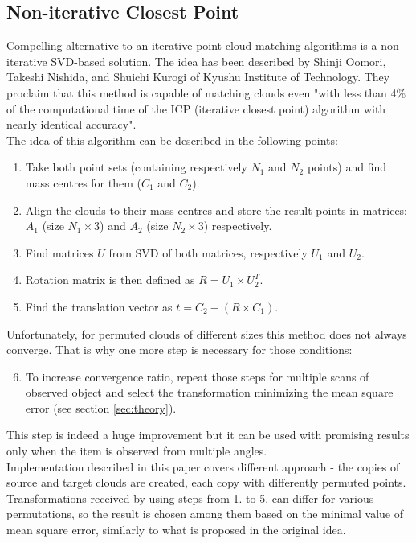 \documentclass[titlepage]{article}
\begin{document}
\subsection{Non-iterative Closest Point}
Compelling alternative to an iterative point cloud matching algorithms is a non-iterative SVD-based solution. The idea has been described by Shinji Oomori, Takeshi Nishida, and Shuichi Kurogi of Kyushu Institute of Technology. They proclaim that this method is capable of matching clouds even "with less than 4\% of the computational time of the ICP (iterative closest point) algorithm with nearly identical accuracy"\cite{nicp}.\\
The idea of this algorithm can be described in the following points:
\begin{enumerate}
\item Take both point sets (containing respectively $N_1$ and $N_2$ points) and find mass centres for them ($C_1$ and $C_2$).
\item Align the clouds to their mass centres and store the result points in matrices: $A_1$ (size $N_1 \times 3$) and $A_2$ (size $N_2 \times 3$) respectively.
\item Find matrices $U$ from SVD of both matrices, respectively $U_1$ and $U_2$.
\item Rotation matrix is then defined as $R = U_1 \times U_2^T$.
\item Find the translation vector as $t = C_2 - (R \times C_1)$.
\end{enumerate}
Unfortunately, for permuted clouds of different sizes this method does not always converge. That is why one more step is necessary for those conditions:
\begin{enumerate}
\setcounter{enumi}{5}
\item To increase convergence ratio, repeat those steps for multiple scans of observed object and select the transformation minimizing the mean square error (see section \ref{sec:theory}).
\end{enumerate}
This step is indeed a huge improvement but it can be used with promising results only when the item is observed from multiple angles.\\
Implementation described in this paper covers different approach - the copies of source and target clouds are created, each copy with differently permuted points. Transformations received by using steps from 1. to 5. can differ for various permutations, so the result is chosen among them based on the minimal value of mean square error, similarly to what is proposed in the original idea.
\end{document}
